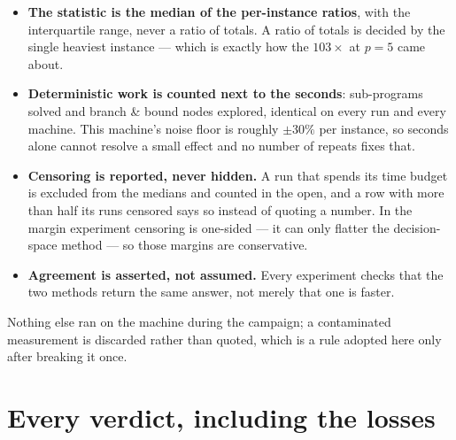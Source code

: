\documentclass[11pt,a4paper]{article}
\begin{document}
\begin{itemize}
\item \textbf{The statistic is the median of the per-instance ratios}, with the
  interquartile range, never a ratio of totals.  A ratio of totals is decided
  by the single heaviest instance --- which is exactly how the $103\times$ at
  $p=5$ came about.
\item \textbf{Deterministic work is counted next to the seconds}: sub-programs
  solved and branch \& bound nodes explored, identical on every run and every
  machine.  This machine's noise floor is roughly $\pm 30\%$ per instance, so
  seconds alone cannot resolve a small effect and no number of repeats fixes
  that.
\item \textbf{Censoring is reported, never hidden.}  A run that spends its time
  budget is excluded from the medians and counted in the open, and a row with
  more than half its runs censored says so instead of quoting a number.  In the
  margin experiment censoring is one-sided --- it can only flatter the
  decision-space method --- so those margins are conservative.
\item \textbf{Agreement is asserted, not assumed.}  Every experiment checks
  that the two methods return the same answer, not merely that one is faster.
\end{itemize}

\noindent
Nothing else ran on the machine during the campaign; a contaminated measurement
is discarded rather than quoted, which is a rule adopted here only after
breaking it once.

\section{Every verdict, including the losses}
\end{document}
